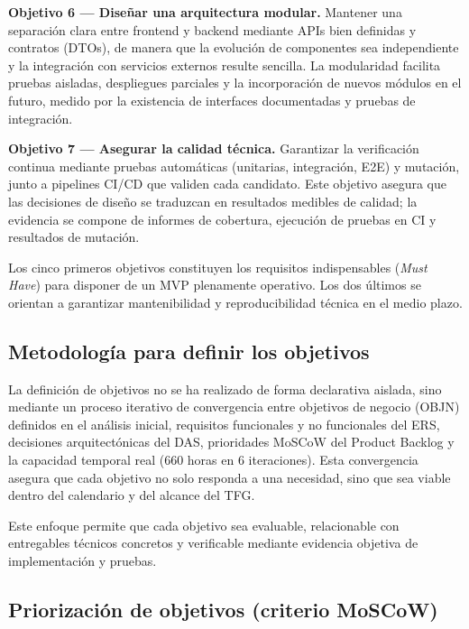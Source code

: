 \textbf{Objetivo 6 — Dise\~nar una arquitectura modular.} Mantener una separaci\'on clara entre frontend y backend mediante APIs bien definidas y contratos (DTOs), de manera que la evoluci\'on de componentes sea independiente y la integraci\'on con servicios externos resulte sencilla. La modularidad facilita pruebas aisladas, despliegues parciales y la incorporaci\'on de nuevos m\'odulos en el futuro, medido por la existencia de interfaces documentadas y pruebas de integraci\'on.

\textbf{Objetivo 7 — Asegurar la calidad t\'ecnica.} Garantizar la verificaci\'on continua mediante pruebas autom\'aticas (unitarias, integraci\'on, E2E) y mutaci\'on, junto a pipelines CI/CD que validen cada candidato. Este objetivo asegura que las decisiones de dise\~no se traduzcan en resultados medibles de calidad; la evidencia se compone de informes de cobertura, ejecuci\'on de pruebas en CI y resultados de mutaci\'on.

Los cinco primeros objetivos constituyen los requisitos indispensables (\emph{Must Have}) para disponer de un MVP plenamente operativo. Los dos \'ultimos se orientan a garantizar mantenibilidad y reproducibilidad t\'ecnica en el medio plazo.


\subsection{Metodolog\'ia para definir los objetivos}

La definici\'on de objetivos no se ha realizado de forma declarativa aislada,
sino mediante un proceso iterativo de convergencia entre objetivos de negocio (OBJN) definidos en el an\'alisis inicial, requisitos funcionales y no funcionales del ERS, decisiones arquitect\'onicas del DAS, prioridades MoSCoW \cite{moscow_method} del Product Backlog y la capacidad temporal real (660 horas en 6 iteraciones). Esta convergencia asegura que cada objetivo no solo responda a una necesidad, sino que sea viable dentro del calendario y del alcance del TFG.

Este enfoque permite que cada objetivo sea evaluable,
relacionable con entregables t\'ecnicos concretos
y verificable mediante evidencia objetiva de implementaci\'on y pruebas.

\subsection{Priorizaci\'on de objetivos (criterio MoSCoW)}

